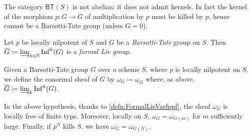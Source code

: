 \begin{rem}[]
	The category $\mathsf{BT}(S)$ is not abelian:
	it does not admit kernels.
	In fact the kernel of the morphism $p\colon G \to G$
	of multiplication by $p$ must be killed by $p$, hence cannot be
	a Barsotti-Tate group (unless $G=0$).
\end{rem}


%
%
\begin{lem}
	Let $p$ be locally nilpotent of $S$ and $G$ be a {\em Barsotti-Tate} group on $S$.
	Then
	$\overline{G} \coloneqq \varinjlim_{k \in \mathbb{N}} \mathrm{Inf}^k(G)$
	is a {\em formal Lie group}.
\end{lem}


\begin{defn}
	Given a Barsotti-Tate group $G$ over a scheme $S$, where $p$ is locally nilpotent on $S$,
	we define the conormal sheaf of $G$ by $\omega_G \coloneqq \omega_{\overline{G}}$
	where, as above, $\overline{G} \coloneqq \varinjlim_k \mathrm{Inf}^k(G)$.
\end{defn}


\begin{rem}\label{rem:ConormalSheafBT}
	In the above hypothesis,
	thanks to \cref{defn:FormalLieVarfppf}, 
	the sheaf $\omega_G$ is
	locally free of finite type.
	Moreover, locally on $S$, $\omega_G = \omega_{G(m)}$ for
	$m$ sufficiently large.
	Finally, if $p^N$ kills $S$, we have $\omega_G = \omega_{G(N)}$.
\end{rem}


